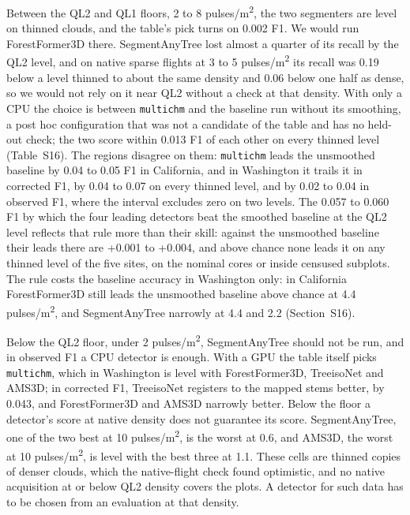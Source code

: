 \documentclass[preprint,12pt,authoryear,a4paper]{elsarticle}
\begin{document}
Between the QL2 and QL1 floors, 2 to 8 pulses/m\textsuperscript{2}, the two segmenters are level
on thinned clouds, and the table's pick turns on 0.002 F1. We would run
ForestFormer3D there. SegmentAnyTree lost almost a quarter of its recall by the
QL2 level, and on native sparse flights at 3 to 5 pulses/m\textsuperscript{2} its recall was 0.19
below a level thinned to about the same density and 0.06 below one half as
dense, so we would not rely on it near QL2 without a check at that density. With
only a CPU the choice is between \texttt{multichm} and the baseline run without its
smoothing, a post hoc configuration that was not a candidate of the table and
has no held-out check; the two score within 0.013 F1 of each other on every
thinned level (Table~S16). The regions disagree on them: \texttt{multichm} leads the
unsmoothed baseline by 0.04 to 0.05 F1 in California, and in Washington it
trails it in corrected F1, by 0.04 to 0.07 on every thinned level, and by 0.02
to 0.04 in observed F1, where the interval excludes zero on two levels. The
0.057 to 0.060 F1 by which the four leading detectors beat the smoothed baseline
at the QL2 level reflects that rule more than their skill: against the
unsmoothed baseline their leads there are +0.001 to +0.004, and above chance
none leads it on any thinned level of the five sites, on the nominal cores or
inside censused subplots. The rule costs the baseline accuracy in Washington
only: in California ForestFormer3D still leads the unsmoothed baseline above
chance at 4.4 pulses/m\textsuperscript{2}, and SegmentAnyTree narrowly at 4.4 and 2.2 (Section~S16).

Below the QL2 floor, under 2 pulses/m\textsuperscript{2}, SegmentAnyTree should not be run, and in
observed F1 a CPU detector is enough. With a GPU the table itself picks
\texttt{multichm}, which in Washington is level with ForestFormer3D, TreeisoNet and
AMS3D; in corrected F1, TreeisoNet registers to the mapped stems better, by
0.043, and ForestFormer3D and AMS3D narrowly better. Below the floor a
detector's score at native density does not guarantee its score. SegmentAnyTree,
one of the two best at 10 pulses/m\textsuperscript{2}, is the worst at 0.6, and AMS3D, the worst
at 10 pulses/m\textsuperscript{2}, is level with the best three at 1.1. These cells are thinned
copies of denser clouds, which the native-flight check found optimistic, and no
native acquisition at or below QL2 density covers the plots. A detector for such
data has to be chosen from an evaluation at that density.
\end{document}

